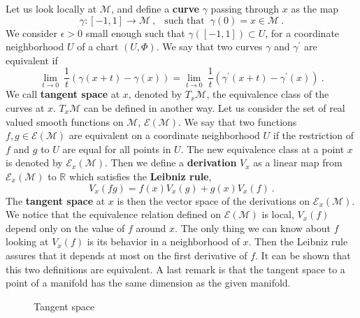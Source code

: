 \documentclass[11pt]{book}
\newcommand{\Ecal}{\mathcal{E}}
\newcommand{\Mcal}{\mathcal{M}}
\newcommand{\Rbb}{\mathbb{R}}
\theoremstyle{break}
\begin{document}
Let us look locally at $\Mcal$, and define a \textbf{curve} $\gamma$ passing through $x$ as the map  
%
\begin{equation*}
\gamma : [-1,1] \to \Mcal \ , \ \ \mbox{ such that } \ \gamma(0) = x \in \Mcal \ .
\end{equation*}
%
We consider $\epsilon > 0$ small enough such that $\gamma([-1,1]) \subset U$, for a coordinate neighborhood $U$ of a chart $(U,\Phi)$. We say that two curves $\gamma$ and $\gamma^\prime$ are equivalent if
%
\begin{equation*}
\underset{t \to 0}{\lim} \ \frac{1}{t} \left( \gamma(x+t) - \gamma(x) \right) = \underset{t \to 0}{\lim} \ \frac{1}{t} \left( \gamma^\prime(x+t) - \gamma^\prime(x) \right) \ .
\end{equation*}
%
We call \textbf{tangent space} at $x$, denoted by $T_x\Mcal$, the equivalence class of the curves at $x$. $T_x\Mcal$ can be defined in another way. Let us consider the set of real valued smooth functions on $\Mcal$, $\Ecal(\Mcal)$. We say that two functions $f, g \in \Ecal(\Mcal)$ are equivalent on a coordinate neighborhood $U$ if the restriction of $f$ and $g$ to $U$ are equal for all points in $U$. The new equivalence class at a point $x$ is denoted by $\Ecal_x(\Mcal)$. Then we define a \textbf{derivation} $V_x$ as a linear map from $\Ecal_x(\Mcal)$ to $\Rbb$ which satisfies the \textbf{Leibniz rule},
%
\begin{equation*}
V_x(fg) = f(x) V_x(g) + g(x) V_x(f) \ .
\end{equation*}
%
The \textbf{tangent space} at $x$ is then the vector space of the derivations on $\Ecal_x(\Mcal)$. We notice that the equivalence relation defined on $\Ecal(\Mcal)$ is local, $V_x(f)$ depend only on the value of $f$ around $x$. The only thing we can know about $f$ looking at $V_x(f)$ is its behavior in a neighborhood of $x$. Then the Leibniz rule assures that it depends at most on the first derivative of $f$. It can be shown that this two definitions are equivalent. A last remark is that the tangent space to a point of a manifold has the same dimension as the given manifold.


\begin{figure}[ht!]
\begin{center}
\end{center}
\caption{Tangent space}
\end{figure}
\end{document}

